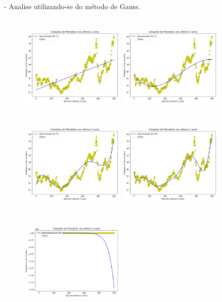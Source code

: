 \documentclass{article}
\begin{document}
\item - Analise utilizando-se do método de Gauss.
\begin{figure}[!htb]
\includegraphics [width=5cm,height=5cm]{Gauss/G1.png}
\includegraphics [width=5cm,height=5cm]{Gauss/G3.png}
\includegraphics [width=5cm,height=5cm]{Gauss/G5.png}
\includegraphics [width=5cm,height=5cm]{Gauss/G10.png}
\includegraphics [width=5cm,height=5cm]{Gauss/G15.png}

\end{figure}
\end{document}
